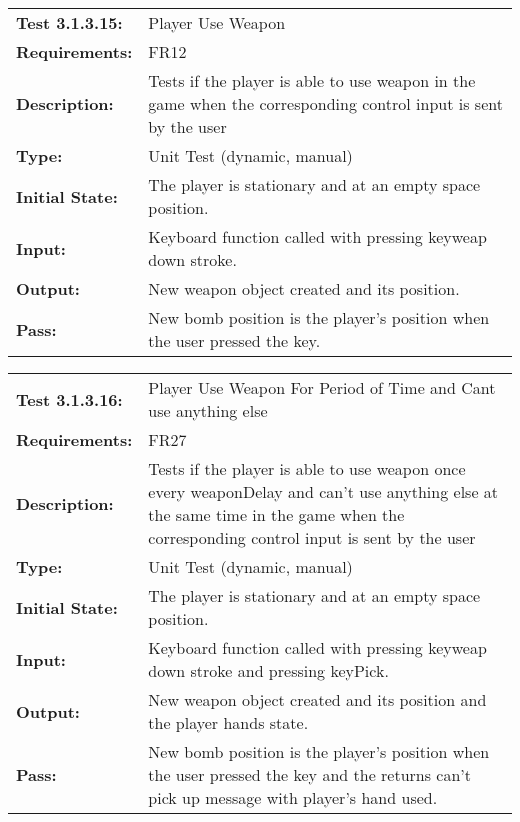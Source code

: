 \documentclass[12pt, titlepage]{article}
\begin{document}
\begin{tabular}{|l|p{10cm}|}
    \hline
    \bf{Test} 3.1.3.15: &  Player Use Weapon\\
    \bf{Requirements}: & FR12\\
    \bf{Description}: & Tests if the player is able to use weapon in the game when the corresponding control input is sent by the user \\
    \bf{Type}: & Unit Test (dynamic, manual) \\
    \bf{Initial State}: & The player is stationary and at an empty space position. \\
    \bf{Input}: & Keyboard function called with pressing keyweap down stroke.\\
    \bf{Output}: & New weapon object created and its position.\\
    \bf{Pass}: & New bomb position is the player's position when the user pressed the key.\\
    \hline
\end{tabular}

\begin{tabular}{|l|p{10cm}|}
    \hline
    \bf{Test} 3.1.3.16: &  Player Use Weapon For Period of Time and Cant use anything else\\
    \bf{Requirements}: & FR27\\
    \bf{Description}: & Tests if the player is able to use weapon once every weaponDelay and can't use anything else at the same time in the game when the corresponding control input is sent by the user \\
    \bf{Type}: & Unit Test (dynamic, manual) \\
    \bf{Initial State}: & The player is stationary and at an empty space position. \\
    \bf{Input}: & Keyboard function called with pressing keyweap down stroke and pressing keyPick.\\
    \bf{Output}: & New weapon object created and its position and the player hands state.\\
    \bf{Pass}: & New bomb position is the player's position when the user pressed the key and the returns can't pick up message with player's hand used.\\
    \hline
\end{tabular}
\end{document}
